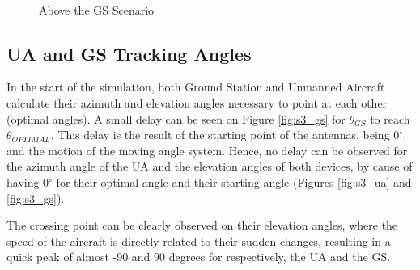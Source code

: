 \begin{figure}[H]
	\\
	\caption{Above the GS Scenario}
	\label{fig:s3_map}
\end{figure}

\subsection*{UA and GS Tracking Angles}
In the start of the simulation, both Ground Station and Unmanned Aircraft calculate their azimuth and elevation angles necessary to point at each other (optimal angles). A small delay can be seen on Figure \ref{fig:s3_gs} for $\theta_{GS}$ to reach $\theta_{OPTIMAL}$. This delay is the result of the starting point of the antennas, being 0$^{\circ}$, and the motion of the moving angle system. Hence, no delay can be observed for the azimuth angle of the UA and the elevation angles of both devices, by cause of having 0$^{\circ}$ for their optimal angle and their starting angle (Figures \ref{fig:s3_ua} and \ref{fig:s3_gs}).

The crossing point can be clearly observed on their elevation angles, where the speed of the aircraft is directly related to their sudden changes, resulting in a quick peak of almost -90 and 90 degrees for respectively, the UA and the GS. 

